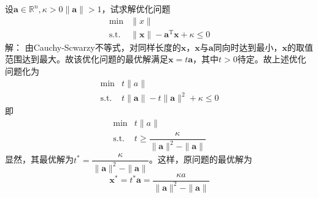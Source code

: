 \begin{example}
    设$\boldsymbol{a}\in\mathbb{R}^n,\kappa>0\|\boldsymbol{a}\|>1$，试求解优化问题
    \[
        \begin{array}{rl}
            \min & \|x\|\\
            \operatorname{s.t.} & \|\boldsymbol{x}\|-\boldsymbol{a}^{\mathrm{T}}\boldsymbol{x}+\kappa\leqslant 0
        \end{array}
    \]
    解：
    由Cauchy-Scwarzy不等式，对同样长度的$\boldsymbol{x}$，$\boldsymbol{x}$与$\boldsymbol{a}$同向时达到最小，$\boldsymbol{x}$的取值范围达到最大。故该优化问题的最优解满足$\boldsymbol{x} = t\boldsymbol{a}$，其中$t>0$待定。故上述优化问题化为
    \[
        \begin{array}{rl}
            \min & t\|a\|\\
            \operatorname{s.t.} & t\|\boldsymbol{a}\|-t\|\boldsymbol{a}\|^2+\kappa\leqslant 0
        \end{array}
    \]
    即
    \[
        \begin{array}{rl}
            \min & t\|a\|\\
            \operatorname{s.t.} & t\geqslant\dfrac{\kappa}{\|\boldsymbol{a}\|^2-\|\boldsymbol{a}\|}
        \end{array}
    \]
    显然，其最优解为$t^* = \dfrac{\kappa}{\|\boldsymbol{a}\|^2-\|\boldsymbol{a}\|}$。这样，原问题的最优解为
    \[
        \boldsymbol{x}^* = t^*\boldsymbol{a} = \dfrac{\kappa a}{\|\boldsymbol{a}\|^2-\|\boldsymbol{a}\|}
    \]
\end{example}
